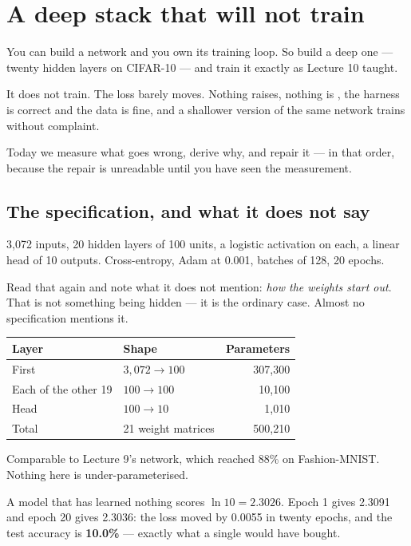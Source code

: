 \documentclass[11pt,a4paper]{article}
\begin{document}

\section{A deep stack that will not train}

You can build a network and you own its training loop. So build a deep one ---
twenty hidden layers on CIFAR-10 --- and train it exactly as Lecture 10 taught.

It does not train. The loss barely moves. Nothing raises, nothing is
, the harness is correct and the data is fine, and a shallower
version of the same network trains without complaint.

Today we measure what goes wrong, derive why, and repair it --- in that order,
because the repair is unreadable until you have seen the measurement.

\subsection{The specification, and what it does not say}

3{,}072 inputs, 20 hidden layers of 100 units, a logistic activation on each, a
linear head of 10 outputs. Cross-entropy, Adam at 0.001, batches of 128, 20
epochs.

Read that again and note what it does not mention: \emph{how the weights start
out}. That is not something being hidden --- it is the ordinary case. Almost no
specification mentions it.

\begin{center}
\small
\begin{tabular}{llr}
\toprule
\textbf{Layer} & \textbf{Shape} & \textbf{Parameters} \\
\midrule
First & $3{,}072 \to 100$ & 307{,}300 \\
Each of the other 19 & $100 \to 100$ & 10{,}100 \\
Head & $100 \to 10$ & 1{,}010 \\
\midrule
Total & 21 weight matrices & 500{,}210 \\
\bottomrule
\end{tabular}
\end{center}

Comparable to Lecture 9's network, which reached 88\% on Fashion-MNIST.
Nothing here is under-parameterised.

A model that has learned nothing scores $\ln 10 = 2.3026$. Epoch 1 gives
2.3091 and epoch 20 gives 2.3036: the loss moved by 0.0055 in twenty epochs,
and the test accuracy is \textbf{10.0\%} --- exactly what a single
 would have bought.
\end{document}
